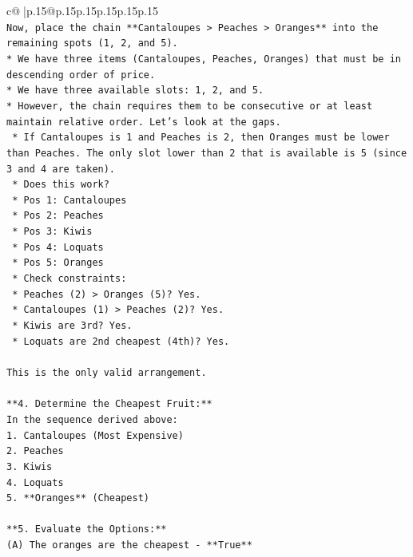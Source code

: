 \documentclass{article}
\begin{document}
{\begin{supertabular}{c@{$\;$}|p{.15\linewidth}@{}p{.15\linewidth}p{.15\linewidth}p{.15\linewidth}p{.15\linewidth}p{.15\linewidth}}
{{{\\ 
\texttt{Now, place the chain **Cantaloupes > Peaches > Oranges** into the remaining spots (1, 2, and 5).} \\
\texttt{*   We have three items (Cantaloupes, Peaches, Oranges) that must be in descending order of price.} \\
\texttt{*   We have three available slots: 1, 2, and 5.} \\
\texttt{*   However, the chain requires them to be consecutive or at least maintain relative order. Let's look at the gaps.} \\
\texttt{    *   If Cantaloupes is 1 and Peaches is 2, then Oranges must be lower than Peaches. The only slot lower than 2 that is available is 5 (since 3 and 4 are taken).} \\
\texttt{    *   Does this work?} \\
\texttt{        *   Pos 1: Cantaloupes} \\
\texttt{        *   Pos 2: Peaches} \\
\texttt{        *   Pos 3: Kiwis} \\
\texttt{        *   Pos 4: Loquats} \\
\texttt{        *   Pos 5: Oranges} \\
\texttt{    *   Check constraints:} \\
\texttt{        *   Peaches (2) > Oranges (5)? Yes.} \\
\texttt{        *   Cantaloupes (1) > Peaches (2)? Yes.} \\
\texttt{        *   Kiwis are 3rd? Yes.} \\
\texttt{        *   Loquats are 2nd cheapest (4th)? Yes.} \\
\\ 
\texttt{This is the only valid arrangement.} \\
\\ 
\texttt{**4. Determine the Cheapest Fruit:**} \\
\texttt{In the sequence derived above:} \\
\texttt{1.  Cantaloupes (Most Expensive)} \\
\texttt{2.  Peaches} \\
\texttt{3.  Kiwis} \\
\texttt{4.  Loquats} \\
\texttt{5.  **Oranges** (Cheapest)} \\
\\ 
\texttt{**5. Evaluate the Options:**} \\
\texttt{(A) The oranges are the cheapest {-} **True**} \\
}}}
\end{supertabular}}
\end{document}
